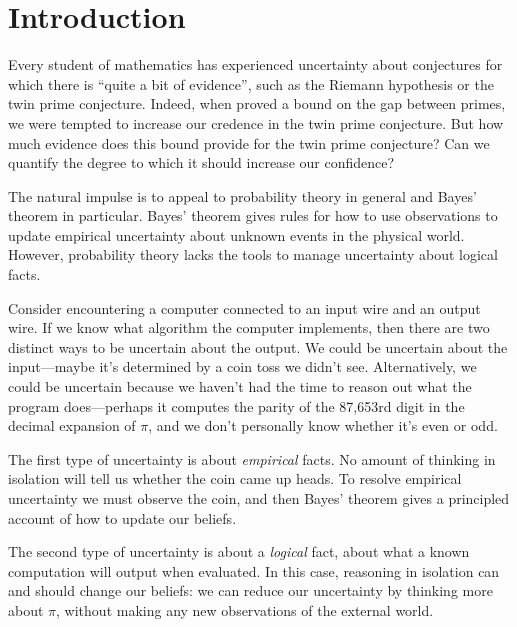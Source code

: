 \documentclass[authordate,onecolumn,noenvironments]{miri-tech-article}
\numberwithin{equation}{subsection}
\begin{document}
\tableofcontents
\newpage

%
%
%
%
%
%
%
%
%
%
%
%
%
%
%
%
%
\section{Introduction}\label{sec:intro}

Every student of mathematics has experienced uncertainty about conjectures for which there is ``quite a bit of evidence'', such as the Riemann hypothesis or the twin prime conjecture. Indeed, when \citet{zhang2014bounded} proved a bound on the gap between primes, we were tempted to increase our credence in the twin prime conjecture. But how much evidence does this bound provide for the twin prime conjecture? Can we quantify the degree to which it should increase our confidence?

The natural impulse is to appeal to probability theory in general and Bayes' theorem in particular. Bayes' theorem gives rules for how to use observations to update empirical uncertainty about unknown events in the physical world. However, probability theory lacks the tools to manage uncertainty about logical facts.

Consider encountering a computer connected to an input wire and an output wire. If we know what algorithm the computer implements, then there are two distinct ways to be uncertain about the output. We could be uncertain about the input---maybe it's determined by a coin toss we didn't see. Alternatively, we could be uncertain because we haven't had the time to reason out what the program does---perhaps it computes the parity of the 87,653rd digit in the decimal expansion of $\pi$, and we don't personally know whether it's even or odd.

The first type of uncertainty is about \emph{empirical} facts. No amount of thinking in isolation will tell us whether the coin came up heads. To resolve empirical uncertainty we must observe the coin, and then Bayes' theorem gives a principled account of how to update our beliefs.

The second type of uncertainty is about a \emph{logical} fact, about what a known computation will output when evaluated. In this case, reasoning in isolation can and should change our beliefs: we can reduce our uncertainty by thinking more about $\pi$, without making any new observations of the external world.  
\end{document}
